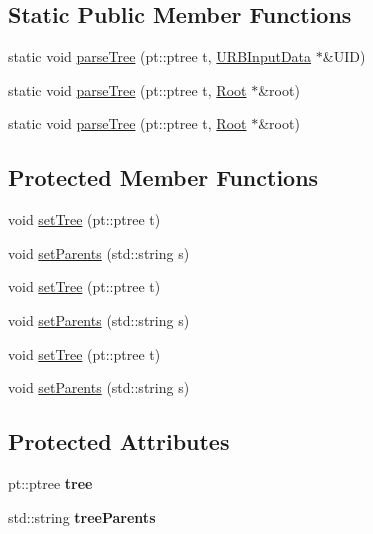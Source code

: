 \subsection*{Static Public Member Functions}
\begin{DoxyCompactItemize}
\item 
static void \hyperlink{classParseInterface_a47a3d184a3746c20169383e867e85d3a}{parse\+Tree} (pt\+::ptree t, \hyperlink{classURBInputData}{U\+R\+B\+Input\+Data} $\ast$\&U\+ID)
\item 
static void \hyperlink{classParseInterface_a40785f4b5636c69df24784ba151716ac}{parse\+Tree} (pt\+::ptree t, \hyperlink{classRoot}{Root} $\ast$\&root)
\item 
static void \hyperlink{classParseInterface_a90a82d1495a227ed4fa757935c2843a8}{parse\+Tree} (pt\+::ptree t, \hyperlink{classRoot}{Root} $\ast$\&root)
\end{DoxyCompactItemize}
\subsection*{Protected Member Functions}
\begin{DoxyCompactItemize}
\item 
void \hyperlink{classParseInterface_af983d932c4a708ffeba59fe71b46c2dc}{set\+Tree} (pt\+::ptree t)
\item 
void \hyperlink{classParseInterface_a000ce4b52a192d2a7d0bfeaeb38fc358}{set\+Parents} (std\+::string s)
\item 
void \hyperlink{classParseInterface_af983d932c4a708ffeba59fe71b46c2dc}{set\+Tree} (pt\+::ptree t)
\item 
void \hyperlink{classParseInterface_a000ce4b52a192d2a7d0bfeaeb38fc358}{set\+Parents} (std\+::string s)
\item 
void \hyperlink{classParseInterface_af983d932c4a708ffeba59fe71b46c2dc}{set\+Tree} (pt\+::ptree t)
\item 
void \hyperlink{classParseInterface_a000ce4b52a192d2a7d0bfeaeb38fc358}{set\+Parents} (std\+::string s)
\end{DoxyCompactItemize}
\subsection*{Protected Attributes}
\begin{DoxyCompactItemize}
\item 
\mbox{\label{classParseInterface_a0da456d91cbfd2fdc59c67b525b1b578}} 
pt\+::ptree {\bfseries tree}
\item 
\mbox{\label{classParseInterface_a67d43a4cf288733ceec9478ab7c55193}} 
std\+::string {\bfseries tree\+Parents}
\end{DoxyCompactItemize}


